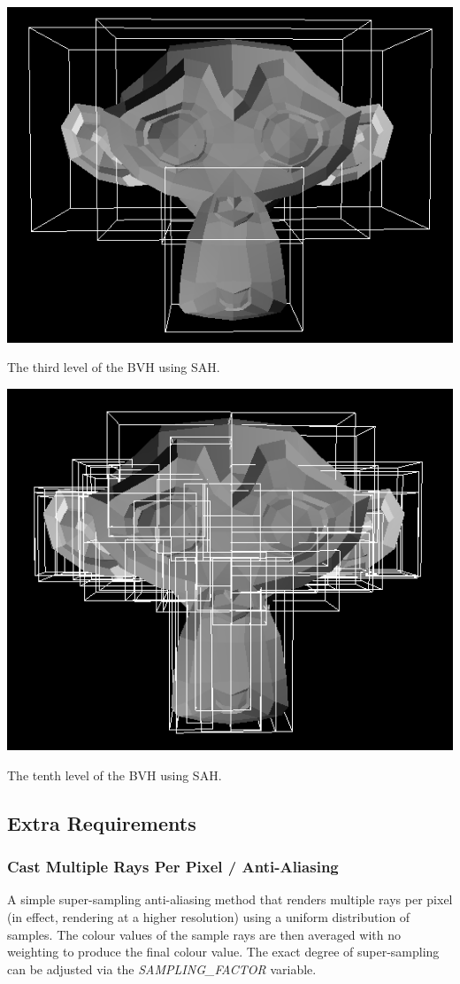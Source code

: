 \documentclass{article}
\begin{document}
\begin{center}
        \includegraphics[scale=0.75]{images/bvh_level_three.png}

        The third level of the BVH using SAH.

        \includegraphics[scale=0.75]{images/bvh_level_ten.png}

        The tenth level of the BVH using SAH.
    \end{center}

    \subsection{Extra Requirements}
    \subsubsection{Cast Multiple Rays Per Pixel / Anti-Aliasing}
    A simple super-sampling anti-aliasing method that renders multiple rays per pixel (in effect, rendering at a higher resolution) using a uniform distribution of samples.
    The colour values of the sample rays are then averaged with no weighting to produce the final colour value.
    The exact degree of super-sampling can be adjusted via the \emph{SAMPLING\_FACTOR} variable.
\end{document}
